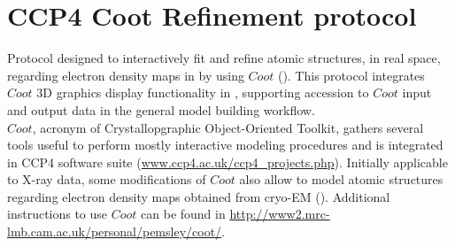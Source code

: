 \section{CCP4 Coot Refinement protocol}
\label{app:ccp4CootRefinement}%
Protocol designed to interactively fit and refine atomic structures, in real space, regarding electron density maps in \scipion by using $Coot$ (\citep{emsley2010}). This protocol integrates $Coot$ 3D graphics display functionality in \scipion, supporting accession to $Coot$ input and output data in the general model building workflow.\\$Coot$, acronym of Crystallopgraphic Object-Oriented Toolkit, gathers several tools useful to perform mostly interactive modeling procedures and is integrated in CCP4 software suite (\url{www.ccp4.ac.uk/ccp4\_projects.php}). Initially applicable to X-ray data, some modifications of $Coot$ also allow to model atomic structures regarding electron density maps obtained from cryo-EM (\citep{brown2015}). Additional instructions to use $Coot$ can be found in \url{http://www2.mrc-lmb.cam.ac.uk/personal/pemsley/coot/}.\\

